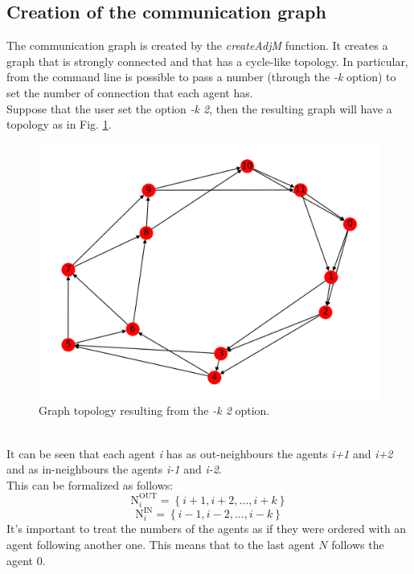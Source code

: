 \documentclass[a4paper,11pt,oneside]{book}
\begin{document}
\subsection{Creation of the communication graph}
The communication graph is created by the \textit{createAdjM} function. It creates a graph that is strongly connected and that has a cycle-like topology. In particular, from the command line is possible to pass a number (through the \textit{-k} option) to set the number of connection that each agent has. \\
Suppose that the user set the option \textit{-k 2}, then the resulting graph will have a topology as in Fig. \ref{cycle_like_graph}. 
\begin{figure}[h]
	\centering
	\includegraphics[scale=0.7]{figs/Graph_12_agents_k=2}
	\caption{Graph topology resulting from the \textit{-k 2} option.}
	\label{cycle_like_graph}
\end{figure}
\\
It can be seen that each agent \textit{i} has as out-neighbours the agents \textit{i+1} and \textit{i+2} and as in-neighbours the agents \textit{i-1} and \textit{i-2}. \\This can be formalized as follows:
\begin{equation}
	\text{N}^{\text{OUT}}_{i} = \left\{i+1, i+2, \dots , i+k  \right\}
\end{equation}
\begin{equation}
	\text{N}^{\text{IN}}_i = \left\{i-1, i-2, \dots, i-k  \right\}
\end{equation}
It's important to treat the numbers of the agents as if they were ordered with an agent following another one. This means that to the last agent $N$ follows the agent $0$.
\end{document}
